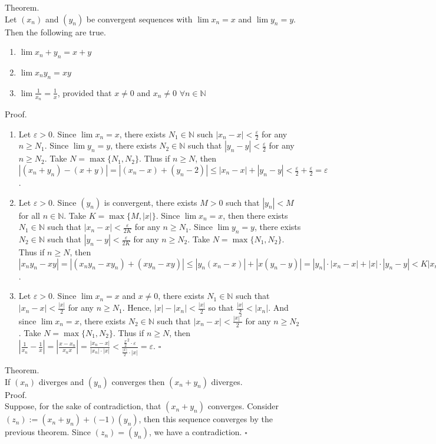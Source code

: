\documentclass[twocolumn]{article}
\newcommand{\qed}{$\square$}
\newcommand{\br}{\vspace{\baselineskip}}
\let\eps\varepsilon
\newcommand{\naturals}{\mathbb{N}}
\begin{document}
Theorem. \\
Let $(x_n)$ and $(y_n)$ be convergent sequences with $\lim x_n = x$ and $\lim y_n = y$. Then the following are true.
\begin{enumerate}
	\item
	$\lim x_n + y_n = x + y$
	\item
	$\lim x_ny_n = xy$
	\item
	$\lim \frac{1}{x_n} = \frac{1}{x}$, provided that $x \neq 0$ and $x_n \neq 0$ $\forall n \in \naturals$
\end{enumerate}
Proof.
\begin{enumerate}
	\item
	Let $\eps > 0$. Since $\lim x_n = x$, there exists $N_1 \in \naturals$ such $|x_n - x| < \frac{\eps}{2}$ for any $n \geq N_1$. Since $\lim y_n = y$, there exists $N_2 \in \naturals$ such that $|y_n - y| < \frac{\eps}{2}$ for any $n \geq N_2$. Take $N = \max \{ N_1, N_2 \}$. Thus if $n \geq N$, then $|(x_n + y_n) - (x + y)| = |(x_n - x) + (y_n - 2)| \leq |x_n - x| + |y_n - y| < \frac{\eps}{2} + \frac{\eps}{2} = \eps$.
	\item
	Let $\eps > 0$. Since $(y_n)$ is convergent, there exists $M > 0$ such that $|y_n| < M$ for all $n \in \naturals$. Take $K = \max \{ M, |x| \}$. Since $\lim x_n = x$, then there exists $N_1 \in \naturals$ such that $|x_n - x| < \frac{\eps}{2K}$ for any $n \geq N_1$. Since $\lim y_n = y$, there exists $N_2 \in \naturals$ such that $|y_n - y| < \frac{\eps}{2K}$ for any $n \geq N_2$. Take $N = \max \{ N_1, N_2 \}$. Thus if $n \geq N$, then $|x_ny_n - xy| = |(x_ny_n - xy_n) + (xy_n - xy)| \leq |y_n(x_n - x)| + |x(y_n - y)| = |y_n| \cdot |x_n - x| + |x| \cdot |y_n - y| < K|x_n - x| + K|y_n - y| < \frac{\eps}{2} + \frac{\eps}{2} = \eps$.
	\item
	Let $\eps > 0$. Since $\lim x_n = x$ and $x \neq 0$, there exists $N_1 \in \naturals$ such that $|x_n - x| < \frac{|x|}{2}$ for any $n \geq N_1$. Hence, $|x| - |x_n| < \frac{|x|}{2}$ so that $\frac{|x|}{2} < |x_n|$. And since $\lim x_n = x$, there exists $N_2 \in \naturals$ such that $|x_n - x| < \frac{|x|^2}{2}$ for any $n \geq N_2$. Take $N = \max \{ N_1, N_2 \}$. Thus if $n \geq N$, then $|\frac{1}{x_n} - \frac{1}{x}| = |\frac{x - x_n}{x_nx}| = \frac{|x_n - x|}{|x_n| \cdot |x|} < \frac{\frac{x}{2}^2 \cdot \eps}{\frac{|x|}{2} \cdot |x|} = \eps$. \qed
\end{enumerate} \br

Theorem. \\
If $(x_n)$ diverges and $(y_n)$ converges then $(x_n + y_n)$ diverges. \\
Proof. \\
Suppose, for the sake of contradiction, that $(x_n + y_n)$ converges. Consider $(z_n) := (x_n + y_n) + (-1)(y_n)$, then this sequence converges by the previous theorem. Since $(z_n) = (y_n)$, we have a contradiction. \qed \\
\end{document}
